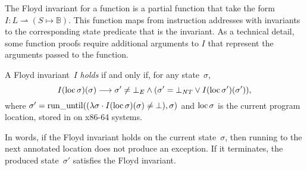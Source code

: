 The Floyd invariant for a function is a partial function
that take the form $I:L\rightharpoonup(S\mapsto\mathbb{B})$.%
%
This function maps from instruction addresses with invariants
to the corresponding state predicate that is the invariant.
As a technical detail, some function proofs require additional arguments to $I$
that represent the arguments passed to the function.
\begin{definition}\label{def:floyd_inv}
  A Floyd invariant~$I$ \emph{holds} if and only if, for any state~$\sigma$,
  \begin{equation}
    I(\operatorname{loc}\sigma)(\sigma)\longrightarrow
    \sigma'\neq\bot_E\wedge(\sigma'=\bot_{\mathit{NT}}\vee I(\operatorname{loc}\sigma')(\sigma')),
  \end{equation}
  where
  $\sigma'=\operatorname{run\_until}((\lambda\sigma\cdot I(\operatorname{loc}\sigma)(\sigma)\neq\bot),\sigma)$%
  and $\operatorname{loc}\sigma$ is the current program location,
  stored in  on x86-64 systems.
\end{definition}
In words, if the Floyd invariant holds on the current state~$\sigma$,
then running to the next annotated location does not produce an exception.
If it terminates, the produced state~$\sigma'$ satisfies the Floyd invariant.

